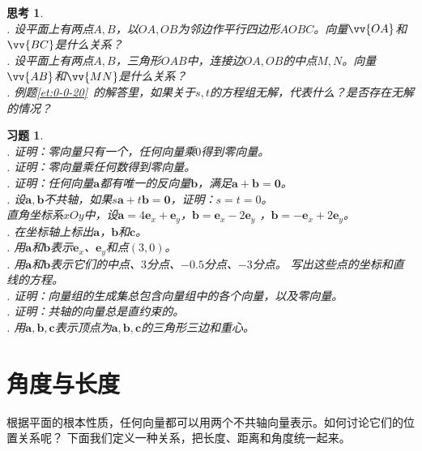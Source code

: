 \documentclass[12pt,UTF8]{ctexbook}
\newtheorem{sk}{思考}[section]
\newtheorem{xt}{习题}[section]
\begin{document}
\begin{sk}\label{sk:0-0-10}
    \mbox{}\\
    . 设平面上有两点$A,B$，以$OA, OB$为邻边作平行四边形$AOBC$。向量$\vv{OA}$和$\vv{BC}$是什么关系？\\
    . 设平面上有两点$A,B$，三角形$OAB$中，连接边$OA, OB$的中点$M,N$。向量$\vv{AB}$和$\vv{MN}$是什么关系？\\
    . 例题\ref{et:0-0-20}\ 的解答里，如果关于$s,t$的方程组无解，代表什么？是否存在无解的情况？
\end{sk}
\begin{xt}\label{xt:0-0-10}
    \mbox{} \\
    . 证明：零向量只有一个，任何向量乘$0$得到零向量。\\
    . 证明：零向量乘任何数得到零向量。\\
    . 证明：任何向量$\mathbf{a}$都有唯一的反向量$\mathbf{b}$，满足$\mathbf{a} + \mathbf{b} = \mathbf{0}$。\\
    . 设$\mathbf{a}, \mathbf{b}$不共轴，如果$s\mathbf{a} + t\mathbf{b} = \mathbf{0}$，证明：$s = t = 0$。\\
    直角坐标系$xOy$中，设$\mathbf{a} = 4\mathbf{e}_x + \mathbf{e}_y$，$\mathbf{b} = \mathbf{e}_x - 2\mathbf{e}_y$
    ，$\mathbf{b} = -\mathbf{e}_x + 2\mathbf{e}_y$。\\
    . 在坐标轴上标出$\mathbf{a}$，$\mathbf{b}$和$\mathbf{c}$。\\
    . 用$\mathbf{a}$和$\mathbf{b}$表示$\mathbf{e}_x$、$\mathbf{e}_y$和点$(3,0)$。\\
    . 用$\mathbf{a}$和$\mathbf{b}$表示它们的中点、$3$分点、$-0.5$分点、$-3$分点。
    写出这些点的坐标和直线的方程。\\
    . 证明：向量组的生成集总包含向量组中的各个向量，以及零向量。\\
    . 证明：共轴的向量总是直约束的。\\
    . 用$\mathbf{a}, \mathbf{b}, \mathbf{c}$表示顶点为$\mathbf{a}, \mathbf{b}, \mathbf{c}$的三角形三边和重心。
\end{xt}

\section{角度与长度}
根据平面的根本性质，任何向量都可以用两个不共轴向量表示。如何讨论它们的位置关系呢？
下面我们定义一种关系，把长度、距离和角度统一起来。
\end{document}
